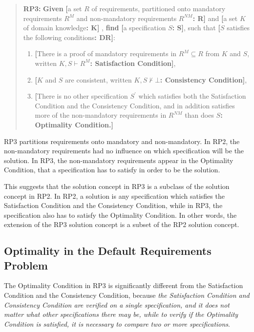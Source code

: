 \documentclass[graybox]{svmult}
\newcommand{\zi}[1]{\textit{#1}}
\newcommand{\xb}[1]{\textbf{#1}}
\newcommand{\RPfull}{Requirements Problem}
\newcommand{\ZJRPfull}{Default \RPfull}
\newcommand{\SatisfactionCondition}{Satisfaction Condition}
\newcommand{\ConsistencyCondition}{Consistency Condition}
\newcommand{\OptimalityCondition}{Optimality Condition}
\newcommand{\CLabel}[2]{\xb{[}#1\xb{: #2]}}
\begin{document}
\begin{quote}
    \xb{RP3:} \xb{Given} \CLabel{a set $R$ of requirements, partitioned onto mandatory requirements $R^{M}$ and non-mandatory requirements $R^{NM}$}{R} and \CLabel{a set $K$ of domain knowledge}{K} , \xb{find} \CLabel{a specification $S$}{S}, such that \CLabel{$S$ satisfies the following conditions}{DR}:
\begin{enumerate}
    \item{\CLabel{There is a proof of mandatory requirements in $R^{M} \subseteq R$ from $K$ and $S$, written $K, S \vdash R^{M}$}{\SatisfactionCondition},}
    \item{\CLabel{$K$ and $S$ are consistent, written $K, S \not\vdash \bot$}{\ConsistencyCondition},}
    \item{\CLabel{There is no other specification $S^{\prime}$ which satisfies both the \SatisfactionCondition{} and the \ConsistencyCondition, and in addition satisfies more of the non-mandatory requirements in $R^{NM}$ than does $S$}{\OptimalityCondition.}}
\end{enumerate}
\end{quote}

RP3 partitions requirements onto mandatory and non-mandatory. In RP2, the non-mandatory requirements had no influence on which specification will be the solution. In RP3, the non-mandatory requirements appear in the \OptimalityCondition, that a specification has to satisfy in order to be the solution.

This suggests that the solution concept in RP3 is a subclass of the solution concept in RP2. In RP2, a solution is any specification which satisfies the \SatisfactionCondition{} and the \ConsistencyCondition, while in RP3, the specification also has to satisfy the \OptimalityCondition. In other words, the extension of the RP3 solution concept is a subset of the RP2 solution concept.


%
\subsection{Optimality in the \ZJRPfull}\label{s:uniqueness:optimality}
The \OptimalityCondition{} in RP3 is significantly different from the \SatisfactionCondition{} and the \ConsistencyCondition, because \zi{the \SatisfactionCondition{} and \ConsistencyCondition{} are verified on a single specification, and it does not matter what other specifications there may be, while to verify if the \OptimalityCondition{} is satisfied, it is necessary to compare two or more specifications}.
\end{document}

